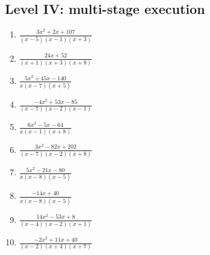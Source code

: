 \documentclass[11pt,oneside]{book}
\begin{document}
\subsection*{Level IV: multi-stage execution}
\begin{enumerate}[leftmargin=*,label=\textbf{\arabic*.},itemsep=0.65\baselineskip]
\item $\displaystyle \frac{3 x^{2} + 2 x + 107}{\left(x - 5\right) \left(x - 1\right) \left(x + 3\right)}$
\item $\displaystyle \frac{24 x + 52}{\left(x + 1\right) \left(x + 3\right) \left(x + 8\right)}$
\item $\displaystyle \frac{5 x^{2} + 45 x - 140}{x \left(x - 7\right) \left(x + 5\right)}$
\item $\displaystyle \frac{- 4 x^{2} + 53 x - 85}{\left(x - 7\right) \left(x - 2\right) \left(x - 1\right)}$
\item $\displaystyle \frac{6 x^{2} - 5 x - 64}{x \left(x - 1\right) \left(x + 8\right)}$
\item $\displaystyle \frac{3 x^{2} - 82 x + 202}{\left(x - 7\right) \left(x - 2\right) \left(x + 8\right)}$
\item $\displaystyle \frac{5 x^{2} - 21 x - 80}{x \left(x - 8\right) \left(x - 5\right)}$
\item $\displaystyle \frac{- 14 x + 40}{x \left(x - 8\right) \left(x - 5\right)}$
\item $\displaystyle \frac{14 x^{2} - 53 x + 8}{\left(x - 4\right) \left(x - 2\right) \left(x + 1\right)}$
\item $\displaystyle \frac{- 2 x^{2} + 11 x + 40}{\left(x - 2\right) \left(x + 4\right) \left(x + 7\right)}$
\end{enumerate}
\end{document}
